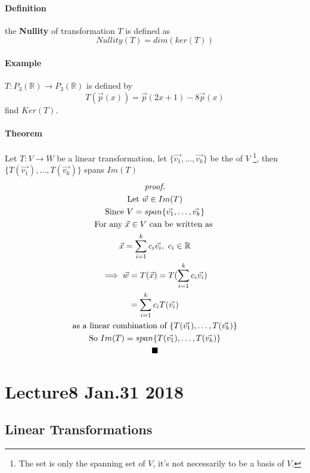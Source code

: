 \documentclass[11pt]{article}
\begin{document}
	\paragraph{Definition} the \textbf{Nullity} of transformation $T$ is defined as
	\[
		Nullity(T) = dim(ker(T))
	\]
	\paragraph{Example} $T:P_3(\mathbb{R})\to P_3(\mathbb{R})$ is  defined by
	\[
		T(\vec{p}(x)) = \vec{p}(2x+1) - 8\vec{p}(x)
	\] find $Ker(T)$.
	
	\paragraph{Theorem} Let $T: V \to W$ be a linear transformation, let $\{\vec{v_1}, \dots, \vec{v_k}\}$ be the  of $V$ \footnote{The set is only the spanning set of $V$, it's not necessarily to be a basis of $V$.}, then $\{T(\vec{v_1}), \dots, T(\vec{v_k})\}$ spans $Im(T)$
	\begin{multline*}
	\emph{proof.} \\
	\text{Let } \vec{w} \in Im(T) \\
	\text{Since } V = span\{\vec{v_1}, \dots, \vec{v_k}\} \\
	\text{For any } \vec{x} \in V \text{ can be written as }\\
	\vec{x} = \sum_{i=1}^k{c_i\vec{v_i}},\ c_i \in \mathbb{R}\\
	\implies \vec{w} = T(\vec{x}) = T(\sum_{i=1}^k{c_i\vec{v_i}}) \\
	= \sum_{i=1}^k{c_iT(\vec{v_i})} \\
	\text{as a linear combination of } \{T(\vec{v_1}), \dots, T(\vec{v_k})\} \\
	\text{So } Im(T) = span\{T(\vec{v_1}), \dots, T(\vec{v_k})\} \\
	\blacksquare
	\end{multline*}
	
	\section{Lecture8 Jan.31 2018}
	\subsection{Linear Transformations}
\end{document}
